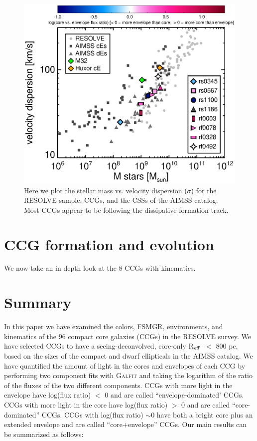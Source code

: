 \documentclass[iop,apj]{emulateapj}
\newcommand{\Reff}{R$_{\rm eff}$}
\begin{document}
\begin{figure}[b]
\begin{center}
\includegraphics{faber-jackson_resolvesigmas.eps}
\caption{Here we plot the stellar mass vs. velocity dispersion ($\sigma$) for the RESOLVE sample, CCGs, and the CSSs of the AIMSS catalog. Most CCGs appear to be following the dissipative formation track.}
\label{fig:sigma}
\end{center}
\end{figure}

\section{CCG formation and evolution} %
\label{discussion}

We now take an in depth look at the 8 CCGs with kinematics. 


\section{Summary}
\label{conclusions}

\noindent In this paper we have examined the colors, FSMGR, environments, and kinematics of the 96 compact core galaxies (CCGs) in the RESOLVE survey. We have selected CCGs to have a seeing-deconvolved, core-only \Reff\ $<$ 800 pc, based on the sizes of the compact and dwarf ellipticals in the AIMSS catalog. We have quantified the amount of light in the cores and envelopes of each CCG by performing two component fits with \textsc{Galfit} and taking the logarithm of the ratio of the fluxes of the two different components. CCGs with more light in the envelope have log(flux ratio) $<$ 0 and are called ``envelope-dominated' CCGs. CCGs with more light in the core have log(flux ratio) $>$ 0 and are called ``core-dominated'' CCGs. CCGs with log(flux ratio) $\sim 0$ have both a bright core plus an extended envelope and are called ``core+envelope'' CCGs. Our main results can be summarized as follows:
\end{document}
